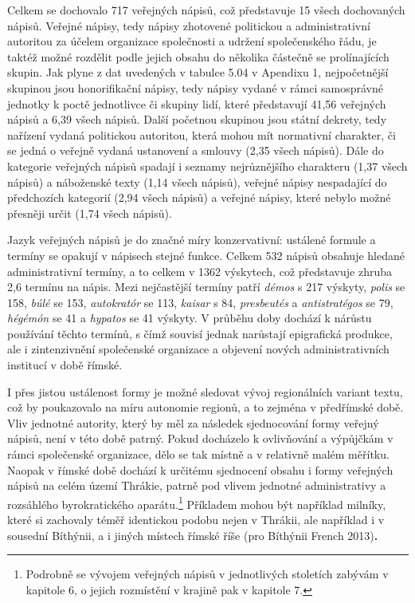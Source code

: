 Celkem se dochovalo 717 veřejných nápisů, což představuje 15  všech dochovaných nápisů. Veřejné nápisy, tedy nápisy zhotovené politickou a administrativní autoritou za účelem organizace společnosti a udržení společenského řádu, je taktéž možné rozdělit podle jejich obsahu do několika částečně se prolínajících skupin. Jak plyne z dat uvedených v tabulce 5.04 v Apendixu 1, nejpočetnější skupinou jsou honorifikační nápisy, tedy nápisy vydané v rámci samosprávné jednotky k poctě jednotlivce či skupiny lidí, které představují 41,56  veřejných nápisů a 6,39  všech nápisů. Další početnou skupinou jsou státní dekrety, tedy nařízení vydaná politickou autoritou, která mohou mít normativní charakter, či se jedná o veřejně vydaná ustanovení a smlouvy (2,35  všech nápisů). Dále do kategorie veřejných nápisů spadají i seznamy nejrůznějšího charakteru (1,37  všech nápisů) a náboženské texty (1,14  všech nápisů), veřejné nápisy nespadající do předchozích kategorií (2,94  všech nápisů) a veřejné nápisy, které nebylo možné přesněji určit (1,74  všech nápisů).

Jazyk veřejných nápisů je do značné míry konzervativní: ustálené formule a termíny se opakují v nápisech stejné funkce. Celkem 532 nápisů obsahuje hledané administrativní termíny, a to celkem v 1362 výskytech, což představuje zhruba 2,6 termínu na nápis. Mezi nejčastější termíny patří {\em démos} s 217 výskyty, {\em polis} se 158, {\em búlé} se 153, {\em autokratór} se 113, {\em kaisar} s 84, {\em presbeutés} a {\em antistratégos} se 79, {\em hégémón} se 41 a {\em hypatos} se 41 výskyty. V průběhu doby dochází k nárůstu používání těchto termínů, s čímž souvisí jednak narůstají epigrafická produkce, ale i zintenzivnění společenské organizace a objevení nových administrativních institucí v době římské.

I přes jistou ustálenost formy je možné sledovat vývoj regionálních variant textu, což by poukazovalo na míru autonomie regionů, a to zejména v předřímské době. Vliv jednotné autority, který by měl za následek sjednocování formy veřejný nápisů, není v této době patrný. Pokud docházelo k ovlivňování a výpůjčkám v rámci společenské organizace, dělo se tak místně a v relativně malém měřítku. Naopak v římské době dochází k určitému sjednocení obsahu i formy veřejných nápisů na celém území Thrákie, patrně pod vlivem jednotné administrativy a rozsáhlého byrokratického aparátu.\footnote{Podrobně se vývojem veřejných nápisů v jednotlivých stoletích zabývám v kapitole 6, o jejich rozmístění v krajině pak v kapitole 7.} Příkladem mohou být například milníky, které si zachovaly téměř identickou podobu nejen v Thrákii, ale například i v sousední Bíthýnii, a i jiných místech římské říše (pro Bíthýnii French 2013){\bf .}

